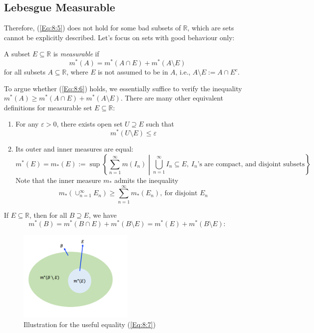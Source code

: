 \subsection{Lebesgue Measurable}
Therefore, (\ref{Eq:8:5}) does not hold for some bad subsets of $\mathbb{R}$, which are sets cannot be explicitly described.
Let's focus on sets with good behaviour only:
\begin{definition}\label{def:8:2}
A subset $E\subseteq\mathbb{R}$ is \emph{measurable} if 
\begin{equation}\label{Eq:8:6}
m^*(A)=m^*(A\cap E)+m^*(A\setminus E)
\end{equation}
for all subsets $A\subseteq\mathbb{R}$, where $E$ is not assumed to be in $A$, i.e., $A\setminus E:=A\cap E^c$.
\end{definition}
\begin{remark}
To argue whether (\ref{Eq:8:6}) holds, we essentially suffice to verify the inequality $m^*(A)\ge m^*(A\cap E)+m^*(A\setminus E)$.
There are many other equivalent definitions for measurable set $E\subseteq\mathbb{R}$:
\begin{enumerate}
\item
For any $\varepsilon>0$, there exists open set $U\supseteq E$ such that 
\[
m^*(U\setminus E)\le\varepsilon
\]
\item
Its outer and inner measures are equal:
\[
m^*(E)=m_*(E):=\sup\left\{\sum_{n=1}^\infty m(I_n)\middle|\bigcup_{n=1}^\infty I_n\subseteq E,\ \text{$I_n$'s are compact, and disjoint subsets}\right\}
\]
Note that the inner measure $m_*$ admits the inequality
\[
m_*(\cup_{n=1}^\infty E_n)\ge\sum_{n=1}^\infty m_*(E_n),\ \text{for disjoint $E_n$}
\]

\end{enumerate}
\end{remark}

\begin{remark}
If $E\subseteq\mathbb{R}$, then for all $B\supseteq E$, we have
\begin{equation}\label{Eq:8:7}
m^*(B) = m^*(B\cap E)+m^*(B\setminus E) = m^*(E) + m^*(B\setminus E):
\end{equation}
\begin{figure}[H]
\centering
\includegraphics[width=0.5\textwidth]{week7/p_1}
\caption{Illustration for the useful equality (\ref{Eq:8:7})}
\end{figure}
\end{remark}

